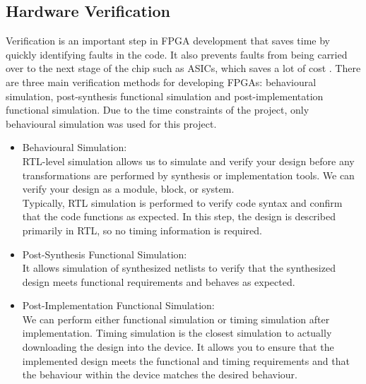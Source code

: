 \subsection{Hardware Verification}
Verification is an important step in FPGA development that saves time by quickly identifying faults in the code. It also prevents faults from being carried over to the next stage of the chip such as ASICs, which saves a lot of cost \cite{RN204}. There are three main verification methods for developing FPGAs: behavioural simulation, post-synthesis functional simulation and post-implementation functional simulation\cite{RN205}. Due to the time constraints of the project, only behavioural simulation was used for this project.
\begin{itemize}
    \item Behavioural Simulation:\\RTL-level simulation allows us to simulate and verify your design before any transformations are performed by synthesis or implementation tools. We can verify your design as a module, block, or system.\\
    Typically, RTL simulation is performed to verify code syntax and confirm that the code functions as expected. In this step, the design is described primarily in RTL, so no timing information is required.
    \item Post-Synthesis Functional Simulation:\\It allows simulation of synthesized netlists to verify that the synthesized design meets functional requirements and behaves as expected.
    \item Post-Implementation Functional Simulation:\\We can perform either functional simulation or timing simulation after implementation. Timing simulation is the closest simulation to actually downloading the design into the device. It allows you to ensure that the implemented design meets the functional and timing requirements and that the behaviour within the device matches the desired behaviour.
\end{itemize}

